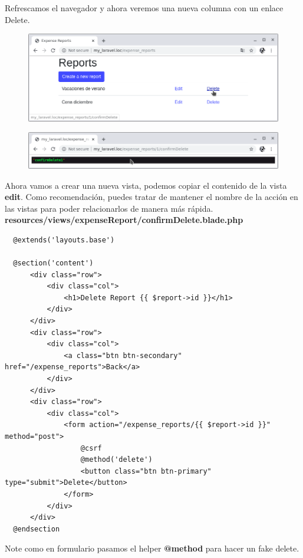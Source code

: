 \documentclass{article}
\begin{document}
Refrescamos el navegador y ahora veremos una nueva columna con un enlace
Delete.\\

\begin{figure}[h!]
  \centering
  \includegraphics[scale=0.5]{./Pictures/077_delete.png}
\end{figure}

\begin{figure}[h!]
  \centering
  \includegraphics[scale=0.5]{./Pictures/078_confirm_delete1.png}
\end{figure}

Ahora vamos a crear una nueva vista, podemos copiar el contenido de la vista
\textbf{edit}. Como recomendación, puedes tratar de mantener el nombre de la
acción en las vistas para poder relacionarlos de manera más rápida.\\

\textbf{resources/views/expenseReport/confirmDelete.blade.php}
\begin{verbatim}
  @extends('layouts.base')

  @section('content')
      <div class="row">
          <div class="col">
              <h1>Delete Report {{ $report->id }}</h1>
          </div>
      </div>
      <div class="row">
          <div class="col">
              <a class="btn btn-secondary" href="/expense_reports">Back</a>
          </div>
      </div>
      <div class="row">
          <div class="col">
              <form action="/expense_reports/{{ $report->id }}" method="post">
                  @csrf
                  @method('delete')
                  <button class="btn btn-primary" type="submit">Delete</button>
              </form>
          </div>
      </div>
  @endsection
\end{verbatim}

Note como en formulario pasamos el helper \textbf{@method} para hacer un fake
delete.\\
\end{document}
